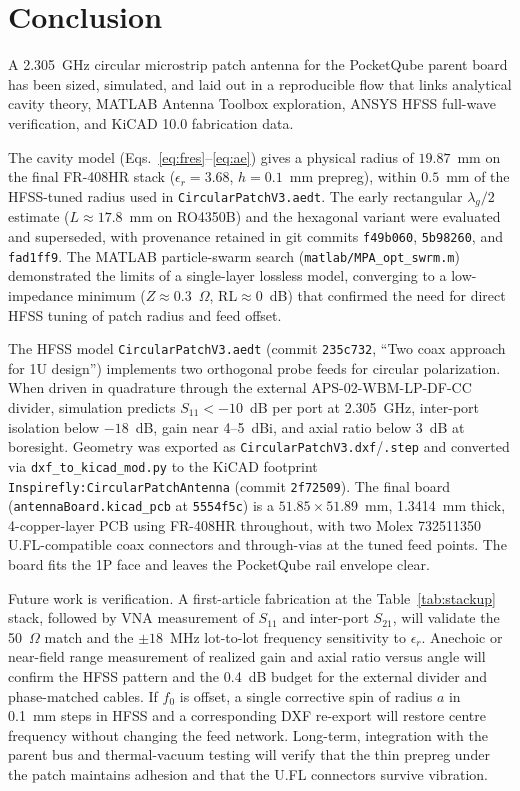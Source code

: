%
%
%
%

\chapter{Conclusion}

A 2.305~GHz circular microstrip patch antenna for the PocketQube parent board has been sized, simulated, and laid out in a reproducible flow that links analytical cavity theory, MATLAB Antenna Toolbox exploration, ANSYS HFSS full-wave verification, and KiCAD 10.0 fabrication data.

The cavity model (Eqs.~\ref{eq:fres}--\ref{eq:ae}) gives a physical radius of $19.87$~mm on the final FR-408HR stack ($\epsilon_r=3.68$, $h=0.1$~mm prepreg), within $0.5$~mm of the HFSS-tuned radius used in \texttt{CircularPatchV3.aedt}. The early rectangular $\lambda_g/2$ estimate ($L\approx 17.8$~mm on RO4350B) and the hexagonal variant were evaluated and superseded, with provenance retained in git commits \texttt{f49b060}, \texttt{5b98260}, and \texttt{fad1ff9}. The MATLAB particle-swarm search (\texttt{matlab/MPA\_opt\_swrm.m}) demonstrated the limits of a single-layer lossless model, converging to a low-impedance minimum ($Z\approx 0.3$~$\Omega$, RL${}\approx 0$~dB) that confirmed the need for direct HFSS tuning of patch radius and feed offset.

The HFSS model \texttt{CircularPatchV3.aedt} (commit \texttt{235c732}, ``Two coax approach for 1U design'') implements two orthogonal probe feeds for circular polarization. When driven in quadrature through the external APS-02-WBM-LP-DF-CC divider, simulation predicts $S_{11} < -10$~dB per port at 2.305~GHz, inter-port isolation below $-18$~dB, gain near 4--5~dBi, and axial ratio below 3~dB at boresight. Geometry was exported as \texttt{CircularPatchV3.dxf}/\texttt{.step} and converted via \texttt{dxf\_to\_kicad\_mod.py} to the KiCAD footprint \texttt{Inspirefly:CircularPatchAntenna} (commit \texttt{2f72509}). The final board (\texttt{antennaBoard.kicad\_pcb} at \texttt{5554f5c}) is a $51.85 \times 51.89$~mm, 1.3414~mm thick, 4-copper-layer PCB using FR-408HR throughout, with two Molex 732511350 U.FL-compatible coax connectors and through-vias at the tuned feed points. The board fits the 1P face and leaves the PocketQube rail envelope clear.

Future work is verification. A first-article fabrication at the Table~\ref{tab:stackup} stack, followed by VNA measurement of $S_{11}$ and inter-port $S_{21}$, will validate the 50~$\Omega$ match and the $\pm 18$~MHz lot-to-lot frequency sensitivity to $\epsilon_r$. Anechoic or near-field range measurement of realized gain and axial ratio versus angle will confirm the HFSS pattern and the 0.4~dB budget for the external divider and phase-matched cables. If $f_0$ is offset, a single corrective spin of radius $a$ in 0.1~mm steps in HFSS and a corresponding DXF re-export will restore centre frequency without changing the feed network. Long-term, integration with the parent bus and thermal-vacuum testing will verify that the thin prepreg under the patch maintains adhesion and that the U.FL connectors survive vibration.

